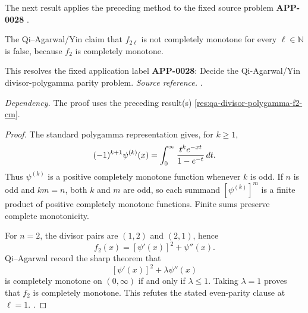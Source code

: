The next result applies the preceding method to the fixed source problem \textbf{APP-0028} \cite{app-app-0028-source}.
\begin{counterexample}
\label{res:qa-divisor-polygamma-even-claim-refuted}
The Qi--Agarwal/Yin claim that \(f_{2\ell}\) is not completely monotone for every \(\ell\in\mathbb N\) is false, because \(f_2\) is completely monotone.

This resolves the fixed application label \textbf{APP-0028}: Decide the Qi-Agarwal/Yin divisor-polygamma parity problem.
\emph{Source reference.} \cite{app-app-0028-source}.

\emph{Dependency.} The proof uses the preceding result(s) \ref{res:qa-divisor-polygamma-f2-cm}.
\end{counterexample}
\begin{proof}
The standard polygamma representation gives, for \(k\ge1\),
\[
 (-1)^{k+1}\psi^{(k)}(x)
 =\int_0^\infty {t^ke^{-xt}\over1-e^{-t}}\,dt .
\]
Thus \(\psi^{(k)}\) is a positive completely monotone function whenever
\(k\) is odd.  If \(n\) is odd and \(km=n\), both \(k\) and \(m\) are odd, so
each summand \([\psi^{(k)}]^m\) is a finite product of positive completely
monotone functions.  Finite sums preserve complete monotonicity.

For \(n=2\), the divisor pairs are \((1,2)\) and \((2,1)\), hence
\[
 f_2(x)=[\psi'(x)]^2+\psi''(x).
\]
Qi--Agarwal record the sharp theorem that
\[
 [\psi'(x)]^2+\lambda\psi''(x)
\]
is completely monotone on \((0,\infty)\) if and only if \(\lambda\le1\).
Taking \(\lambda=1\) proves that \(f_2\) is completely monotone.  This refutes
the stated even-parity clause at \(\ell=1\). \cite{app-app-0028-source}.
\end{proof}

